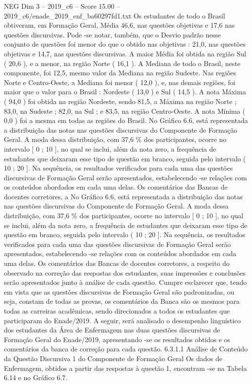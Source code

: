 \begin{textsample}{NEG Dim 3 – 2019\_c6 – Score 15.00 – 2019\_c6/enade\_2019\_enf\_ba60297fd1.txt}
Os estudantes de todo o Brasil obtiveram, em Formação Geral, Média 46,6, nas questões objetivas e 17,6 nas questões discursivas.
Pode -se notar, também, que o Desvio padrão nesse conjunto de questões foi menor do que o obtido nas objetivas : 21,0, nas questões objetivas e 14,7, nas questões discursivas.
A maior Média foi obtida na região Sul ( 20,6 ), e a menor, na região Norte ( 16,1 ).
A Mediana de todo o Brasil, neste componente, foi 12,5, mesmo valor da Mediana na região Sudeste.
Nas regiões Norte e Centro-Oeste, a Mediana foi menor ( 12,0 ), e, nas demais regiões, foi maior que o valor para o Brasil : Nordeste ( 13,0 ) e Sul ( 14,5 ).
A nota Máxima ( 94,0 ) foi obtida na região Nordeste, sendo 81,5, a Máxima na região Norte ; 83,0, na Sudeste ; 82,0, na Sul ; e 83,5, na região Centro-Oeste.
A nota Mínima ( 0,0 ) foi a mesma em todas as regiões do Brasil.
No Gráfico 6.6, está representada a distribuição das notas nas questões discursivas do Componente de Formação Geral.
A moda dessa distribuição, com 37,6 \% dos participantes, ocorre no intervalo [ 0 ; 10 ], no qual se inclui, além da nota zero, a frequência de estudantes que deixaram esse tipo de questão em branco, seguida pelo intervalo ( 10 ; 20 ].
Na sequência, os resultados verificados para cada uma das questões discursivas de Formação Geral serão apresentados, estabelecendo -se relações com os conteúdos abordados em cada uma delas.
Os comentários das Bancas de docentes corretores, a No Gráfico 6.6, está representada a distribuição das notas nas questões discursivas do Componente de Formação Geral.
A moda dessa distribuição, com 37,6 \% dos participantes, ocorre no intervalo [ 0 ; 10 ], no qual se inclui, além da nota zero, a frequência de estudantes que deixaram esse tipo de questão em branco, seguida pelo intervalo ( 10 ; 20 ].
Na sequência, os resultados verificados para cada uma das questões discursivas de Formação Geral serão apresentados, estabelecendo -se relações com os conteúdos abordados em cada uma delas.
Os comentários das Bancas de docentes corretores, a respeito do observado na correção das respostas dos estudantes, suas impressões e conclusões serão apresentados junto à análise de cada questão.
Cumpre esclarecer que, tendo em vista que as questões discursivas de Formação Geral são padronizadas, ou seja, constam de todas as provas, os comentários da Banca são os mesmos para todas as carreiras acadêmicas, sendo direcionados a todos os estudantes que participaram do Enade/2019.
A seguir, será analisado o desempenho linguístico dos estudantes da Área de Enfermagem nas duas questões discursivas de Formação Geral do Enade/2019, apresentando -se os resultados obtidos e os comentários da banca de correção para cada questão. 6.3.1.1 Análise de Conteúdo da Questão Discursiva 1 do Componente de Formação Geral Os dados de Enfermagem, obtidos a partir das respostas à questão 1, encontram -se na Tabela 6.14 e no Gráfico 6.7.

\end{textsample}
